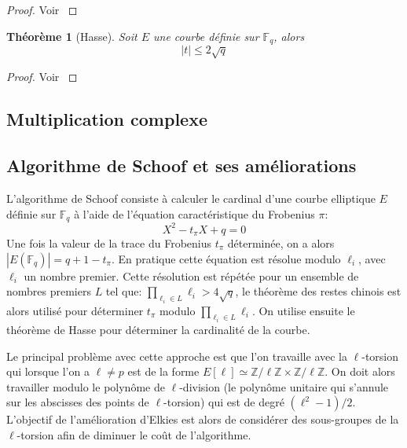 \documentclass[10pt,a4paper]{book}
\theoremstyle{plain}
\newtheorem{thm}{Théorème}
\theoremstyle{definition}
\theoremstyle{definition}
\theoremstyle{definition}
\theoremstyle{definition}
\theoremstyle{remark}
\theoremstyle{remark}
\begin{document}
\begin{proof}
Voir \cite[Theorem V.1.1]{Silv1}
\end{proof}

\begin{thm}[Hasse]
Soit $E$ une courbe définie sur $\mathbb{F}_q$, alors 
\begin{equation}
|t| \leqslant 2 \sqrt{q}
\end{equation}
\end{thm}

\begin{proof}
Voir \cite[Theorem V.1.1]{Silv1}
\end{proof}





\subsection{Multiplication complexe}

\subsection{Algorithme de Schoof et ses améliorations}

L'algorithme de Schoof \cite{Schoof85} consiste à calculer le cardinal d'une courbe elliptique $E$ définie sur $\mathbb{F}_q$ à l'aide de l'équation caractéristique du Frobenius $\pi$:
\begin{equation*}
X^2-t_{\pi}X+q=0
\end{equation*}
Une fois la valeur de la trace du Frobenius $t_{\pi}$ déterminée, on a alors $|E(\mathbb{F}_q)|=q+1-t_{\pi}$. En pratique cette équation est résolue modulo $\ell_i$, avec $\ell_i$ un nombre premier. Cette résolution est répétée pour un ensemble de nombres premiers $L$ tel que: $\prod_{\ell_i \in L}\ell_i>4 \sqrt{q}$, le théorème des restes chinois est alors utilisé pour déterminer $t_{\pi}$ modulo $\prod_{\ell_i \in L}\ell_i$. On utilise ensuite le théorème de Hasse pour déterminer la cardinalité de la courbe.

Le principal problème avec cette approche est que l'on travaille avec la $\ell$-torsion qui lorsque l'on a $\ell \neq p$ est de la forme $E[\ell] \simeq \mathbb{Z}/\ell \mathbb{Z} \times \mathbb{Z}/\ell \mathbb{Z}$. On doit alors travailler modulo le polynôme de $\ell$-division (le polynôme unitaire qui s'annule sur les abscisses des points de $\ell$-torsion) qui est de degré $(\ell^2-1)/2$. L'objectif de l'amélioration d'Elkies est alors de considérer des sous-groupes de la $\ell$-torsion afin de diminuer le coût de l'algorithme.
\end{document}
